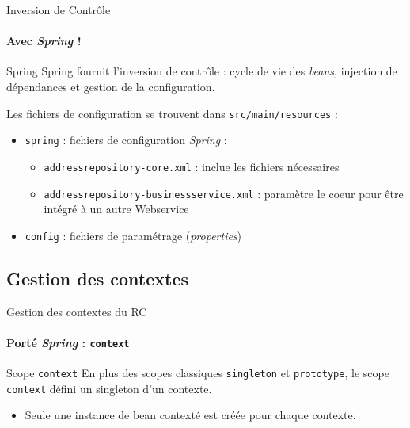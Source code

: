 \documentclass[compact]{beamer}%
\begin{document}
\begin{frame}{Inversion de Contrôle}
	\framesubtitle{Avec \emph{Spring} !}
	
	\begin{block}{Spring}
	Spring fournit l'inversion de contrôle : cycle de vie des \emph{beans}, injection de dépendances et gestion de la configuration.
	\end{block}
	
	\pause
	Les fichiers de configuration se trouvent dans \texttt{src/main/resources} :
	\begin{itemize}[<+->]
	\item \texttt{spring} : fichiers de configuration \emph{Spring} :
		\begin{itemize}[<+->]
		\item \texttt{addressrepository-core.xml} : inclue les fichiers nécessaires
		\item \texttt{addressrepository-businessservice.xml} : paramètre le coeur pour être intégré à un autre Webservice
		\end{itemize}
	\item \texttt{config} : fichiers de paramétrage (\emph{properties})
	\end{itemize}
	
\end{frame}

\subsection{Gestion des contextes}

\begin{frame}{Gestion des contextes du RC}
	\framesubtitle{Porté \emph{Spring} : \texttt{context}}
	
	\begin{block}{Scope \texttt{context}}
En plus des scopes classiques \texttt{singleton} et \texttt{prototype}, le scope \texttt{context} défini un singleton d'un contexte.	
	\end{block}
	
	\pause
	\begin{itemize}
	\item Seule une instance de bean contexté est créée pour chaque contexte.
	\end{itemize}


\end{frame}
\end{document}
